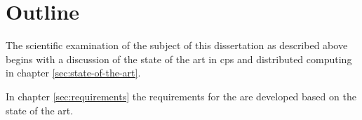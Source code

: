 \section{Outline}
\label{sec:outline}
The scientific examination of the subject of this dissertation as described above begins with a discussion of the state of the art in \ac{cps} and distributed computing in chapter \ref{sec:state-of-the-art}.

In chapter \ref{sec:requirements} the requirements for the \topic are developed based on the state of the art.


